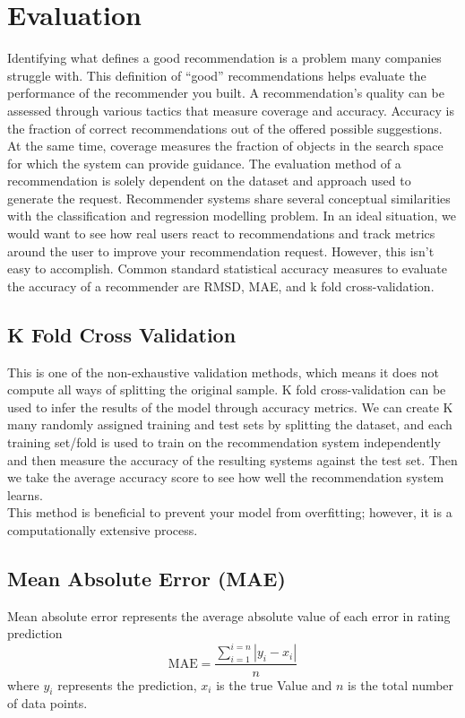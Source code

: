 \section{Evaluation}
Identifying what defines a good recommendation is a problem many companies struggle with. This definition of “good” recommendations helps evaluate the performance of the recommender you built. 
A recommendation's quality can be assessed through various tactics that measure coverage and accuracy. 
Accuracy is the fraction of correct recommendations out of the offered possible suggestions. At the same time, coverage measures the fraction of objects in the search space for which the system can provide guidance. 
The evaluation method of a recommendation is solely dependent on the dataset and approach used to generate the request. 
Recommender systems share several conceptual similarities with the classification and regression modelling problem. 
In an ideal situation, we would want to see how real users react to recommendations and track metrics around the user to improve your recommendation request. However, this isn't easy to accomplish. 
Common standard statistical accuracy measures to evaluate the accuracy of a recommender are RMSD, MAE, and k fold cross-validation.

\subsection{K Fold Cross Validation}
This is one of the non-exhaustive validation methods, which means it does not compute all ways of splitting the original sample. K fold cross-validation can be used to infer the results of the model through accuracy metrics. We can create K many randomly assigned training and test sets by splitting the dataset, and each training set/fold is used to train on the recommendation system independently and then measure the accuracy of the resulting systems against the test set. Then we take the average accuracy score to see how well the recommendation system learns.
\\This method is beneficial to prevent your model from overfitting; however, it is a computationally extensive process.

\subsection{Mean Absolute Error (MAE)}
Mean absolute error represents the average absolute value of each error in rating prediction
\begin{equation*}
\text{MAE} = \frac{\sum^{i=n}_{i=1}|y_{i} - x_{i}|}{n}
\end{equation*}
where $y_{i} $ represents the prediction, $x_{i} $ is the true Value and $n$ is the total number of data points.

